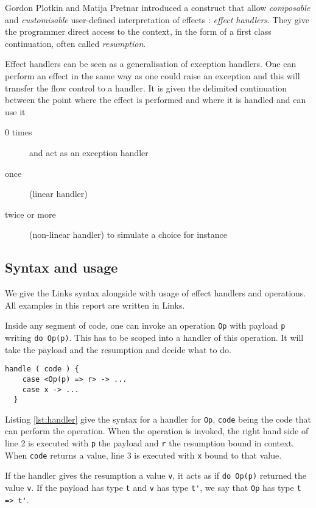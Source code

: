 \documentclass[nonacm=true, language=french, language=english]{acmart}
\begin{document}
Gordon Plotkin and Matija Pretnar \cite{} introduced a construct that allow \emph{composable} and \emph{customisable} user-defined interpretation of effects : \emph{effect handlers}. They give the programmer direct access to the context, in the form of a first class continuation, often called \emph{resumption}.

Effect handlers can be seen as a generalisation of exception handlers. One can perform an effect in the same way as one could raise an exception and this will transfer the flow control to a handler. It is given the delimited continuation between the point where the effect is performed and where it is handled and can use it
\begin{description}
  \item[0 times] and act as an exception handler
  \item[once] (linear handler)
  \item[twice or more] (non-linear handler) to simulate a choice for instance
\end{description}


\subsection{Syntax and usage}

We give the Links syntax alongside with usage of effect handlers and operations. All examples in this report are written in Links.

Inside any segment of code, one can invoke an operation \verb'Op' with payload \verb'p' writing \verb'do Op(p)'. This has to be scoped into a handler of this operation. It will take the payload and the resumption and decide what to do.

\begin{lstlisting}[caption=Handler,label=lst:handler]
  handle ( code ) {
    case <Op(p) => r> -> ...
    case x -> ...
  }
\end{lstlisting}

Listing \ref{lst:handler} give the syntax for a handler for \verb'Op', \verb'code' being the code that can perform the operation. When the operation is invoked, the right hand side of line 2 is executed with \verb'p' the payload and \verb'r' the resumption bound in context. When \verb'code' returns a value, line 3 is executed with \verb'x' bound to that value.

If the handler gives the resumption a value \verb'v', it acts as if \verb'do Op(p)' returned the value \verb'v'. If the payload has type \verb't' and \verb|v| has type \verb|t'|, we say that \verb|Op| has type \verb|t => t'|.
\end{document}
